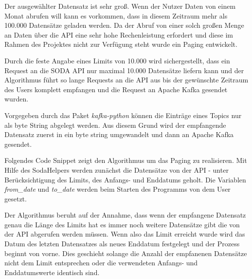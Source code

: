 Der ausgewählter Datensatz ist sehr groß.
Wenn \zb{} der Nutzer Daten von einem Monat abrufen will kann es vorkommen,
dass in diesem Zeitraum mehr als 100.000 Datensätze geladen werden.
Da der Abruf von einer solch großen Menge an Daten über die API eine sehr hohe Rechenleistung erfordert und diese im Rahmen des Projektes nicht zur Verfügung steht wurde
ein Paging entwickelt.

Durch die feste Angabe eines Limits von 10.000 wird sichergestellt, dass ein Request an die \ac{SODA} \ac{API} nur maximal 10.000
Datensätze liefern kann und der Algorithmus führt so lange Requests an die \ac{API} aus bis der gewünschte Zeitraum des Users komplett empfangen und
die Request an Apache Kafka gesendet wurden.

Vorgegeben durch das Paket \textit{kafka-python} können die Einträge eines Topics nur als byte String abgelegt werden.
Aus diesem Grund wird der empfangende Datensatz zuerst in ein byte string umgewandelt und dann an Apache Kafka gesendet.

Folgendes Code Snippet zeigt den Algorithmus um das Paging zu realisieren.
Mit Hilfe des SodaHelpers werden zunächst die Datensätze von der \ac{API} - unter Berücksichtigung des Limits, des Anfangs- und Enddatums geholt.
Die Variablen \textit{from\_date} und \textit{to\_date} werden beim Starten des Programms von dem User gesetzt.

Der Algorithmus beruht auf der Annahme, dass wenn der empfangene Datensatz genau die Länge des Limits hat es immer noch weitere Datensätze gibt die von der \ac{API} abgerufen werden müssen.
Wenn also das Limit erreicht wurde wird das Datum des letzten Datensatzes als neues Enddatum festgelegt und der Prozess beginnt von vorne.
Dies geschieht solange die Anzahl der empfanenen Datensätze nicht dem Limit entsprechen
oder die verwendeten Anfangs- und Enddatumswerte identisch sind.


